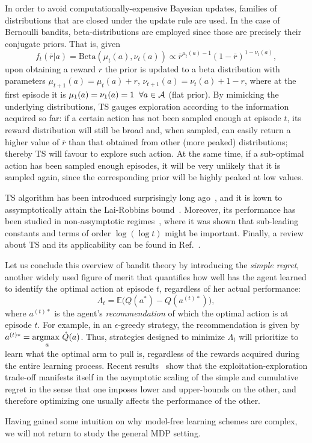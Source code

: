 In order to avoid computationally-expensive Bayesian updates, families of distributions that are closed under the update rule are used. In the case of Bernoulli bandits, beta-distributions are employed since those are precisely their conjugate priors. That is, given
\begin{equation}\label{eq:betaDistro}
f_{t}(\bar{r}|a)=\text{Beta}(\mu_t(a), \nu_t(a))\propto \bar{r}^{\mu_{t}(a)-1}(1-\bar{r})^{1-\nu_{t}(a)},
\end{equation}
upon obtaining a reward $r$ the prior is updated to a beta distribution with parameters  $\mu_{t+1}(a)=\mu_{t}(a) + r$, $\nu_{t+1}(a)=\nu_{t}(a) + 1-r$, where at the first episode it is $\mu_{1}(a)=\nu_{1}(a)=1 \;\; \forall a \in \mathcal{A}$  (flat prior). By mimicking the underlying distributions, TS gauges exploration according to the information acquired so far: if a certain action has not been sampled enough at episode $t$, its reward distribution will still be broad and, when sampled, can easily return a higher value of $\bar r$ than that obtained from other (more peaked) distributions; thereby TS will favour to explore such action. At the same time, if a sub-optimal action has been sampled enough episodes, it will be very unlikely that it is sampled again, since the corresponding prior will be highly peaked at low values. %

TS algorithm has been introduced surprisingly long ago~\cite{Thompson1935}, and it is kown to assymptotically attain the Lai-Robbins bound~\cite{regTS1}. Moreover, its performance has been studied in non-assymptotic regimes~\cite{workTSFOLK}, where it was shown that sub-leading constants and terms of order $\log(\log t)$ might be important. Finally, a review about TS and its applicability can be found in Ref.~\cite{Russo2018}.

Let us conclude this overview of bandit theory by introducing the \textit{simple regret}, another widely used figure of merit that quantifies how well has the agent learned to identify the optimal action at episode $t$, regardless of her actual performance:
\begin{equation}
\Lambda_t = \mathbb{E} \big(Q(a^{*}) - Q(a^{(t)*}) \big),
\end{equation}
where $a^{(t)*}$ is the agent's \emph{recommendation} of which the optimal action is at episode $t$. For example, in an $\epsilon$-greedy strategy, the recommendation is given by $a^{(t)*}=\underset{a}{\text{argmax }}\hat{Q}(a)$. Thus, strategies designed to minimize $\Lambda_t$ will prioritize to learn what the optimal arm to pull is, regardless of the rewards acquired during the entire learning process. %
Recent results~\cite{simpleRegretMunoz} show that the exploitation-exploration trade-off manifests itself in the asymptotic scaling of the simple and cumulative regret in the sense that one imposes lower and upper-bounds on the other, and therefore optimizing one usually affects the performance of the other.

Having gained some intuition on why model-free learning schemes are complex, we will not return to study the general MDP setting.
